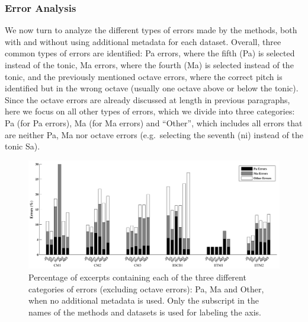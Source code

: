{\subsubsection{Error Analysis}
\label{sec:pre_processing_tonic_identification_error_analysis}

We now turn to analyze the different types of errors made by the methods, both with and without using additional metadata for each dataset. Overall, three common types of errors are identified: Pa errors, where the fifth (Pa) is selected instead of the tonic, Ma errors, where the fourth (Ma) is selected instead of the tonic, and the previously mentioned octave errors, where the correct pitch is identified but in the wrong octave (usually one octave above or below the
tonic). Since the octave errors are already discussed at length in previous paragraphs, here we focus on all other types of errors, which we divide into three categories: Pa (for Pa errors), Ma (for Ma errors) and ``Other'', which includes all errors that are neither Pa, Ma nor octave errors (e.g.~selecting the seventh (\acrshort{ni}) instead of the tonic Sa).


\begin{figure}
	\begin{center}
		\includegraphics[width=\figSizeHundred]{ch05_preprocessing/figures/ErrorAnalysis_Without_MF.pdf}
	\end{center}
	\caption[Percentage of excerpts with Pa, Ma and `Other' type errors in tonic pitch identification by different approaches.]{Percentage of excerpts containing each of the three different
		categories of errors (excluding octave errors): Pa, Ma and Other, when no additional metadata is used. Only the subscript in the names of the methods and datasets is used for labeling the axis.}
	\label{fig:tonic_identification_errors_without_MF}
\end{figure}

}

